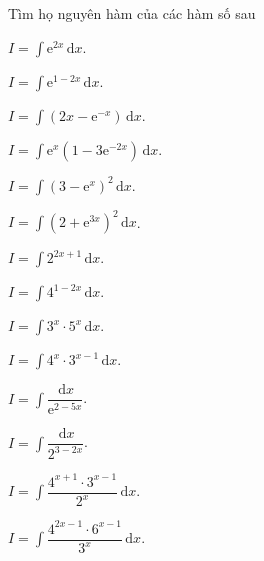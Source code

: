 \begin{vd} %
    Tìm họ nguyên hàm của các hàm số sau
    \begin{listEX}[1]
        \item $I=\displaystyle\int \mathrm{e} ^{2x} \mathrm{\,d}x$.
        \item $I=\displaystyle\int \mathrm{e}^{1-2x} \mathrm{\,d}x$.
        \item $I=\displaystyle\int \left(2x-\mathrm{e}^{-x}\right) \mathrm{\,d}x$.
        \item $I=\displaystyle\int \mathrm{e}^x\left(1-3 \mathrm{e}^{-2x}\right) \mathrm{\,d}x$.
        \item $I=\displaystyle\int \left(3-\mathrm{e}^x\right)^2 \mathrm{\,d}x$.
        \item $I=\displaystyle\int \left(2+\mathrm{e}^{3x}\right)^2 \mathrm{\,d}x$.
        \item $I=\displaystyle\int 2^{2x+1} \mathrm{\,d}x$.
        \item $I=\displaystyle\int 4^{1-2x} \mathrm{\,d}x$.
        \item $I=\displaystyle\int 3^x \cdot 5^x \mathrm{\,d}x$.
        \item $I=\displaystyle\int 4^x \cdot 3^{x-1} \mathrm{\,d}x$.
        \item $I=\displaystyle\int \dfrac{\mathrm{\,d}x}{\mathrm{e}^{2-5x}}$.
        \item $I=\displaystyle\int \dfrac{\mathrm{\,d}x}{2^{3-2x}}$.
        \item $I=\displaystyle\int \dfrac{4^{x+1} \cdot 3^{x-1}}{2^x} \mathrm{\,d}x$.
        \item $I=\displaystyle\int \dfrac{4^{2x-1} \cdot 6^{x-1}}{3^x} \mathrm{\,d}x$.
    \end{listEX}
\end{vd}
